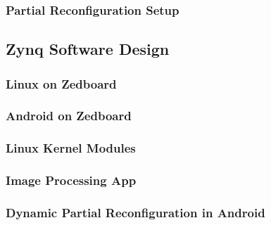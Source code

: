 \subsubsection{Partial Reconfiguration Setup}\label{sssec:partialreconfigurationsetup}

\subsection{Zynq Software Design}\label{ssec:zynqsoftwaredesign}

\subsubsection{Linux on Zedboard}\label{sssec:linuxonzedboard}

\subsubsection{Android on Zedboard}\label{sssec:androidonzedboard}

\subsubsection{Linux Kernel Modules}\label{sssec:linuxkernelmodules}

\subsubsection{Image Processing App}\label{sssec:imageprocessingapp}

\subsubsection{Dynamic Partial Reconfiguration in Android}\label{sssec:dynamicpartialreconfiguration}

